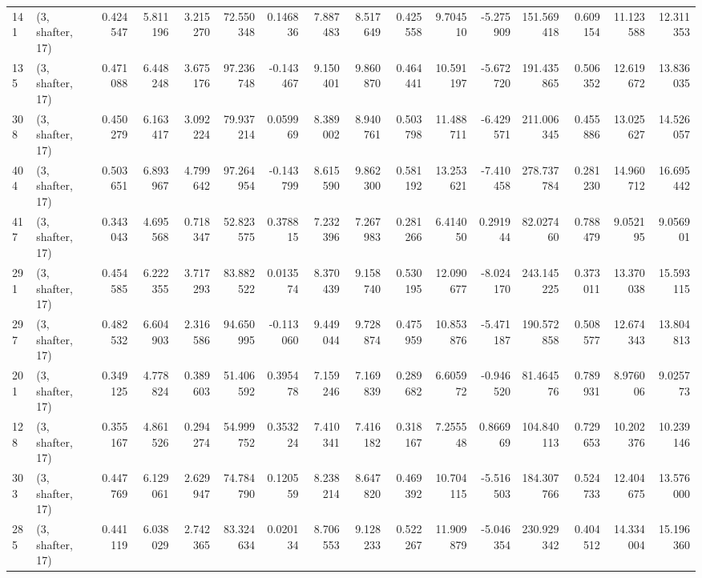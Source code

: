 \begin{tabular}{llrrrrrrrrrrrrrr}
141 &  (3, shafter, 17) &   0.424547 &   5.811196 &   3.215270 &    72.550348 &   0.146836 &   7.887483 &   8.517649 &  0.425558 &   9.704510 &  -5.275909 &   151.569418 &  0.609154 &  11.123588 &  12.311353 \\
135 &  (3, shafter, 17) &   0.471088 &   6.448248 &   3.675176 &    97.236748 &  -0.143467 &   9.150401 &   9.860870 &  0.464441 &  10.591197 &  -5.672720 &   191.435865 &  0.506352 &  12.619672 &  13.836035 \\
308 &  (3, shafter, 17) &   0.450279 &   6.163417 &   3.092224 &    79.937214 &   0.059969 &   8.389002 &   8.940761 &  0.503798 &  11.488711 &  -6.429571 &   211.006345 &  0.455886 &  13.025627 &  14.526057 \\
404 &  (3, shafter, 17) &   0.503651 &   6.893967 &   4.799642 &    97.264954 &  -0.143799 &   8.615590 &   9.862300 &  0.581192 &  13.253621 &  -7.410458 &   278.737784 &  0.281230 &  14.960712 &  16.695442 \\
417 &  (3, shafter, 17) &   0.343043 &   4.695568 &   0.718347 &    52.823575 &   0.378815 &   7.232396 &   7.267983 &  0.281266 &   6.414050 &   0.291944 &    82.027460 &  0.788479 &   9.052195 &   9.056901 \\
291 &  (3, shafter, 17) &   0.454585 &   6.222355 &   3.717293 &    83.882522 &   0.013574 &   8.370439 &   9.158740 &  0.530195 &  12.090677 &  -8.024170 &   243.145225 &  0.373011 &  13.370038 &  15.593115 \\
297 &  (3, shafter, 17) &   0.482532 &   6.604903 &   2.316586 &    94.650995 &  -0.113060 &   9.449044 &   9.728874 &  0.475959 &  10.853876 &  -5.471187 &   190.572858 &  0.508577 &  12.674343 &  13.804813 \\
201 &  (3, shafter, 17) &   0.349125 &   4.778824 &   0.389603 &    51.406592 &   0.395478 &   7.159246 &   7.169839 &  0.289682 &   6.605972 &  -0.946520 &    81.464576 &  0.789931 &   8.976006 &   9.025773 \\
128 &  (3, shafter, 17) &   0.355167 &   4.861526 &   0.294274 &    54.999752 &   0.353224 &   7.410341 &   7.416182 &  0.318167 &   7.255548 &   0.866969 &   104.840113 &  0.729653 &  10.202376 &  10.239146 \\
303 &  (3, shafter, 17) &   0.447769 &   6.129061 &   2.629947 &    74.784790 &   0.120559 &   8.238214 &   8.647820 &  0.469392 &  10.704115 &  -5.516503 &   184.307766 &  0.524733 &  12.404675 &  13.576000 \\
285 &  (3, shafter, 17) &   0.441119 &   6.038029 &   2.742365 &    83.324634 &   0.020134 &   8.706553 &   9.128233 &  0.522267 &  11.909879 &  -5.046354 &   230.929342 &  0.404512 &  14.334004 &  15.196360 \\

\end{tabular}
